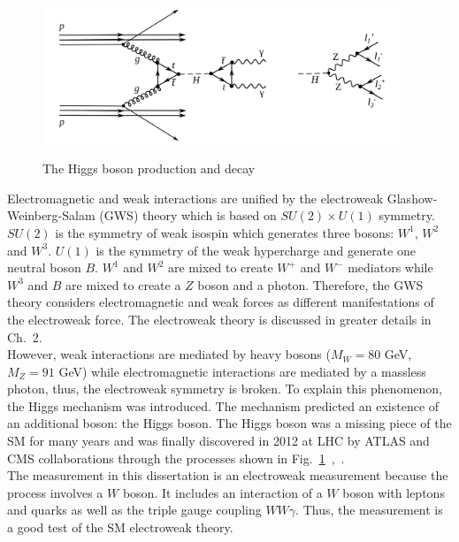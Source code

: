 \begin{figure}[htb]
  \begin{center}
    {\includegraphics[width=0.95\textwidth]{../figs/Intro/FeynmanHiggs.png}}
    \caption{The Higgs boson production and decay}
    \label{fig:higgsProduction}
  \end{center}
\end{figure}

Electromagnetic and weak interactions are unified by the electroweak Glashow-Weinberg-Salam (GWS) theory which is based on $SU(2) \times U(1)$ symmetry. $SU(2)$ is the symmetry of weak isospin which generates three bosons: $W^1$, $W^2$ and $W^3$. $U(1)$ is the symmetry of the weak hypercharge and generate one neutral boson $B$. $W^1$ and $W^2$ are mixed to create $W^+$ and $W^-$ mediators while $W^3$ and $B$ are mixed to create a $Z$ boson and a photon. Therefore, the GWS theory considers electromagnetic and weak forces as different manifestations of the electroweak force. The electroweak theory is discussed in greater details in Ch.~2.\\

However, weak interactions are mediated by heavy bosons ($M_W=80$ GeV, $M_Z=91$ GeV) while electromagnetic interactions are mediated by a massless photon, thus, the electroweak symmetry is broken. To explain this phenomenon, the Higgs mechanism was introduced. The mechanism predicted an existence of an additional boson: the Higgs boson. The Higgs boson was a missing piece of the SM for many years and was finally discovered in 2012 at LHC by ATLAS and CMS collaborations through the processes shown in Fig.~\ref{fig:higgsProduction}~\cite{ref_HiggsPaperCMS},~\cite{ref_HiggsPaperATLAS}.\\


The measurement in this dissertation is an electroweak measurement because the process involves a $W$ boson. It includes an interaction of a $W$ boson with leptons and quarks as well as the triple gauge coupling $WW\gamma$. Thus, the measurement is a good test of the SM electroweak theory.\\ 



